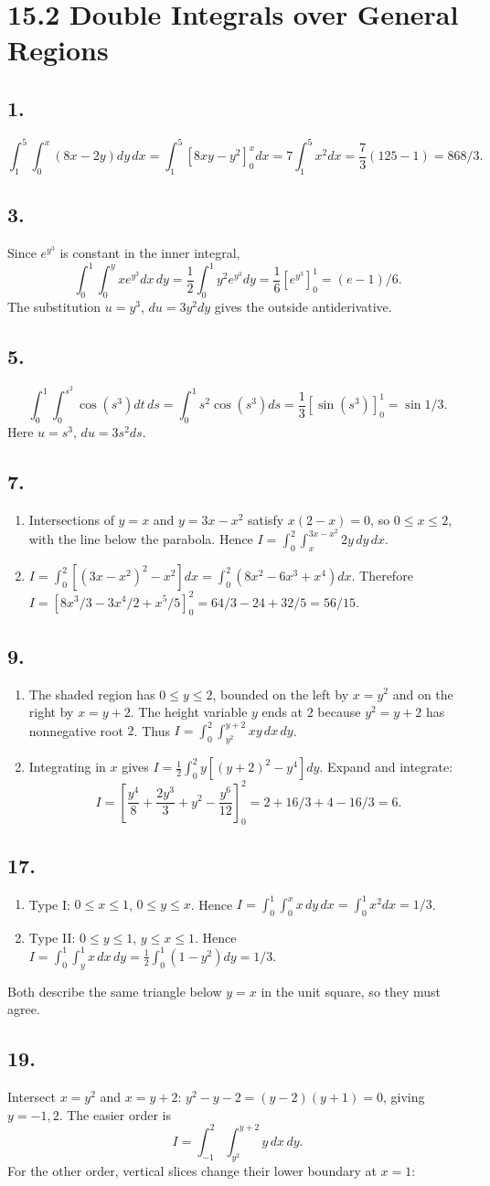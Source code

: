 \documentclass[11pt]{article}
\newcommand{\ex}[1]{\subsection*{#1.}}
\newcommand{\ans}[1]{\boxed{#1}}
\begin{document}
\clearpage\section*{15.2 Double Integrals over General Regions}
\ex{1}
\[\int_1^5\int_0^x(8x-2y)dy\,dx=\int_1^5[8xy-y^2]_0^x dx
=7\int_1^5x^2dx=\frac73(125-1)=\ans{868/3}.\]
\ex{3}
Since $e^{y^3}$ is constant in the inner integral,
\[\int_0^1\int_0^yxe^{y^3}dx\,dy=\frac12\int_0^1y^2e^{y^3}dy
=\frac16[e^{y^3}]_0^1=\ans{(e-1)/6}.\]
The substitution $u=y^3$, $du=3y^2dy$ gives the outside antiderivative.
\ex{5}
\[\int_0^1\int_0^{s^2}\cos(s^3)dt\,ds=\int_0^1s^2\cos(s^3)ds
=\frac13[\sin(s^3)]_0^1=\ans{\sin1/3}.\]
Here $u=s^3$, $du=3s^2ds$.
\ex{7}
\begin{enumerate}[label=(\alph*)]
\item Intersections of $y=x$ and $y=3x-x^2$ satisfy $x(2-x)=0$, so $0\le x\le2$, with the line below the parabola. Hence $\ans{I=\int_0^2\int_x^{3x-x^2}2y\,dy\,dx}$.
\item $I=\int_0^2[(3x-x^2)^2-x^2]dx=\int_0^2(8x^2-6x^3+x^4)dx$. Therefore $I=[8x^3/3-3x^4/2+x^5/5]_0^2=64/3-24+32/5=\ans{56/15}$.
\end{enumerate}
\ex{9}
\begin{enumerate}[label=(\alph*)]
\item The shaded region has $0\le y\le2$, bounded on the left by $x=y^2$ and on the right by $x=y+2$. The height variable $y$ ends at $2$ because $y^2=y+2$ has nonnegative root $2$. Thus $\ans{I=\int_0^2\int_{y^2}^{y+2}xy\,dx\,dy}$.
\item Integrating in $x$ gives $I=\frac12\int_0^2y[(y+2)^2-y^4]dy$. Expand and integrate:
\[I=\left[\frac{y^4}{8}+\frac{2y^3}{3}+y^2-\frac{y^6}{12}\right]_0^2
=2+16/3+4-16/3=\ans{6}.\]
\end{enumerate}
\ex{17}
\begin{enumerate}[label=(\alph*)]
\item Type I: $0\le x\le1$, $0\le y\le x$. Hence $I=\int_0^1\int_0^x x\,dy\,dx=\int_0^1x^2dx=\ans{1/3}$.
\item Type II: $0\le y\le1$, $y\le x\le1$. Hence $I=\int_0^1\int_y^1x\,dx\,dy=\frac12\int_0^1(1-y^2)dy=\ans{1/3}$.
\end{enumerate}
Both describe the same triangle below $y=x$ in the unit square, so they must agree.
\ex{19}
Intersect $x=y^2$ and $x=y+2$: $y^2-y-2=(y-2)(y+1)=0$, giving $y=-1,2$. The easier order is
\[I=\int_{-1}^2\int_{y^2}^{y+2}y\,dx\,dy.\]
For the other order, vertical slices change their lower boundary at $x=1$:
\end{document}
